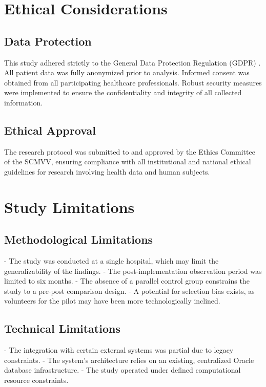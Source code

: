 \section{Ethical Considerations}

\subsection{Data Protection}

This study adhered strictly to the General Data Protection Regulation (GDPR) \cite{european2016}. All patient data was fully anonymized prior to analysis. Informed consent was obtained from all participating healthcare professionals. Robust security measures were implemented to ensure the confidentiality and integrity of all collected information.

\subsection{Ethical Approval}

The research protocol was submitted to and approved by the Ethics Committee of the SCMVV, ensuring compliance with all institutional and national ethical guidelines for research involving health data and human subjects.

\section{Study Limitations}

\subsection{Methodological Limitations}

- The study was conducted at a single hospital, which may limit the generalizability of the findings.
- The post-implementation observation period was limited to six months.
- The absence of a parallel control group constrains the study to a pre-post comparison design.
- A potential for selection bias exists, as volunteers for the pilot may have been more technologically inclined.

\subsection{Technical Limitations}

- The integration with certain external systems was partial due to legacy constraints.
- The system's architecture relies on an existing, centralized Oracle database infrastructure.
- The study operated under defined computational resource constraints.

